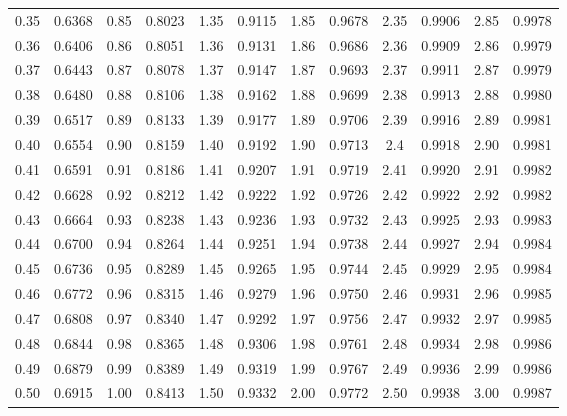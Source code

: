 \begin{table}
\begin{otherlanguage}{english}
\begin{tabular}{|C|C||C|C||C|C||C|C||C|C||C|C|}
0.35 & 0.6368 & 0.85 & 0.8023 & 1.35 & 0.9115 & 1.85 & 0.9678 & 2.35 & 0.9906 & 2.85 & 0.9978 \\[1ex]
0.36 & 0.6406 & 0.86 & 0.8051 & 1.36 & 0.9131 & 1.86 & 0.9686 & 2.36 & 0.9909 & 2.86 & 0.9979 \\
0.37 & 0.6443 & 0.87 & 0.8078 & 1.37 & 0.9147 & 1.87 & 0.9693 & 2.37 & 0.9911 & 2.87 & 0.9979 \\
0.38 & 0.6480 & 0.88 & 0.8106 & 1.38 & 0.9162 & 1.88 & 0.9699 & 2.38 & 0.9913 & 2.88 & 0.9980 \\
0.39 & 0.6517 & 0.89 & 0.8133 & 1.39 & 0.9177 & 1.89 & 0.9706 & 2.39 & 0.9916 & 2.89 & 0.9981 \\
0.40 & 0.6554 & 0.90 & 0.8159 & 1.40 & 0.9192 & 1.90 & 0.9713 & 2.4 & 0.9918 & 2.90 & 0.9981 \\[1ex]
0.41 & 0.6591 & 0.91 & 0.8186 & 1.41 & 0.9207 & 1.91 & 0.9719 & 2.41 & 0.9920 & 2.91 & 0.9982 \\
0.42 & 0.6628 & 0.92 & 0.8212 & 1.42 & 0.9222 & 1.92 & 0.9726 & 2.42 & 0.9922 & 2.92 & 0.9982 \\
0.43 & 0.6664 & 0.93 & 0.8238 & 1.43 & 0.9236 & 1.93 & 0.9732 & 2.43 & 0.9925 & 2.93 & 0.9983 \\
0.44 & 0.6700 & 0.94 & 0.8264 & 1.44 & 0.9251 & 1.94 & 0.9738 & 2.44 & 0.9927 & 2.94 & 0.9984 \\
0.45 & 0.6736 & 0.95 & 0.8289 & 1.45 & 0.9265 & 1.95 & 0.9744 & 2.45 & 0.9929 & 2.95 & 0.9984 \\[1ex]
0.46 & 0.6772 & 0.96 & 0.8315 & 1.46 & 0.9279 & 1.96 & 0.9750 & 2.46 & 0.9931 & 2.96 & 0.9985 \\
0.47 & 0.6808 & 0.97 & 0.8340 & 1.47 & 0.9292 & 1.97 & 0.9756 & 2.47 & 0.9932 & 2.97 & 0.9985 \\
0.48 & 0.6844 & 0.98 & 0.8365 & 1.48 & 0.9306 & 1.98 & 0.9761 & 2.48 & 0.9934 & 2.98 & 0.9986 \\
0.49 & 0.6879 & 0.99 & 0.8389 & 1.49 & 0.9319 & 1.99 & 0.9767 & 2.49 & 0.9936 & 2.99 & 0.9986 \\
0.50 & 0.6915 & 1.00 & 0.8413 & 1.50 & 0.9332 & 2.00 & 0.9772 & 2.50 & 0.9938 & 3.00 & 0.9987 \\
\hline
\end{tabular}
\end{otherlanguage}
\end{table}
\,%
